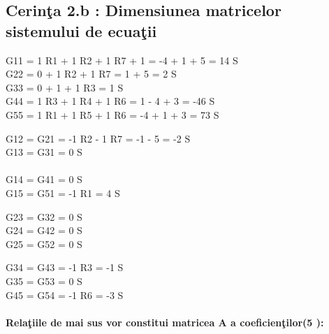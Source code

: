 \documentclass[12pt,twoside]{report}
\numberwithin{figure}{section}
\begin{document}
			\subsection{Cerin\c{t}a 2.b : Dimensiunea matricelor sistemului de ecua\c{t}ii}
			\vspace{1cm}
			{G\small{11} = 1 \setminus R{1} + 1 \setminus R\small{2} + 1 \setminus R\small{7} + 1 \setminus \infty = -4  + 1 \setminus 3 + 5  = 14  S}
			\\
			{G\small{22} = 0 + 1 \setminus R\small{2} + 1 \setminus R\small{7} = 1 \setminus 3 + 5  = 2 S}
			\\
			{G\small{33} = 0 + 1 \setminus \infty + 1 \setminus R\small{3} = 1  S}
			\\
			{G\small{44} = 1 \setminus R{3} + 1 \setminus R\small{4} + 1 \setminus R\small{6}  = 1  - 4 + 3  = -46  S}
			\\
			{G\small{55} = 1 \setminus R{1} + 1 \setminus R\small{5} + 1 \setminus R\small{6} = -4  + 1  + 3  = 73  S\\}
			
			\vspace{1cm}
			{G\small{12} = G\small{21} = -1 \setminus R\small{2} - 1 \setminus R{7} = -1 \setminus 3 - 5  = -2 S}
			\\
			{G\small{13} = G\small{31} = 0 S}
			\\
			\\
			{G\small{14} = G\small{41} = 0 S}
			\\
			{G\small{15} = G\small{51} = -1 \setminus R\small{1} = 4  S}
			
			\vspace{1cm}
			{G\small{23} = G\small{32} = 0 S}
			\\
			{G\small{24} = G\small{42} = 0 S}
			\\
			{G\small{25} = G\small{52} = 0 S}
			
			\vspace{1cm}
			{G\small{34} = G\small{43} = -1 \setminus R\small{3} = -1  S}
			\\
			{G\small{35} = G\small{53} = 0 S}
			\vspace{1cm}
			\\
			{G\small{45} = G\small{54} = -1 \setminus R\small{6} = -3  S}
			\paragraph{Rela\c{t}iile de mai sus vor constitui matricea A a coeficien\c{t}ilor(5 ):}
			\vspace{1cm}
			
\end{document}
